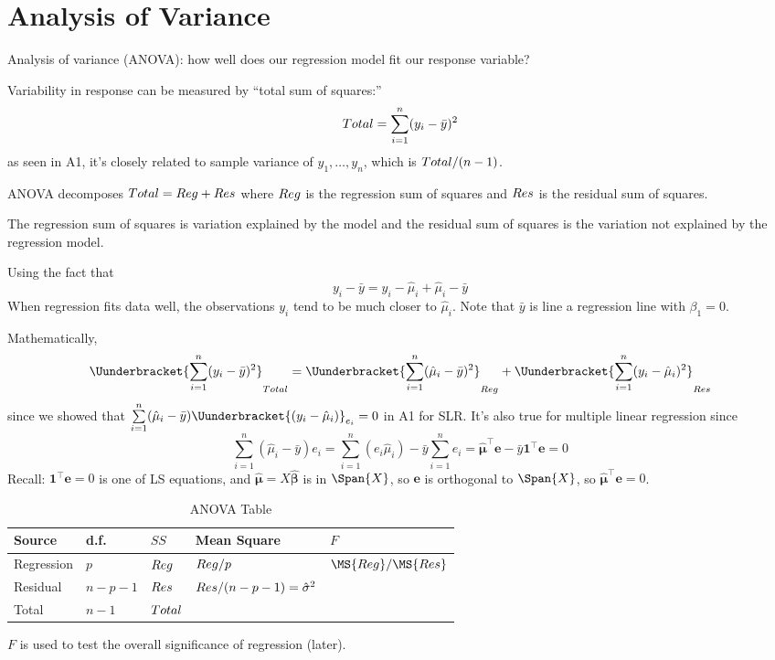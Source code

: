 \section{Analysis of Variance}
Analysis of variance (ANOVA): how well
does our regression model fit our
response variable?

Variability in response can be measured by
``total sum of squares:''
\[ \relax{Total} =
    \sum\limits_{i=1}^{n} (y_i-\bar{y})^2 \]
as seen in A1, it's closely related to
sample variance of $ y_1,\ldots,y_n $,
which is $ \relax{Total}/(n-1) $.

ANOVA decomposes $ \relax{Total}=\relax{Reg}+\relax{Res} $
where $ \relax{Reg} $ is the regression sum of squares
and $ \relax{Res} $ is the residual sum of squares.

The regression sum of squares is variation explained by
the model
and the residual sum of squares is the variation not
explained by the regression model.

Using the fact that
\[ y_i-\bar{y}=y_i-\hat{\mu}_i+\hat{\mu}_i-\bar{y} \]
When regression fits data well,
the observations $ y_i $ tend to be much closer to $ \hat{\mu}_i $.
Note that $ \bar{y} $ is line a regression line with $ \beta_1=0 $.

Mathematically,
\[ \Uunderbracket{\sum\limits_{i=1}^{n} (y_i-\bar{y})^2}_{\SS{Total}}
    =\Uunderbracket{\sum\limits_{i=1}^{n} (\hat{\mu}_i-\bar{y})^2}_{\SS{Reg}}+
    \Uunderbracket{\sum\limits_{i=1}^{n} (y_i-\hat{\mu}_i)^2}_{\SS{Res}} \]
since we showed that $ \sum\limits_{i=1}^{n}(\hat{\mu}_i-\bar{y})
    \Uunderbracket{(y_i-\hat{\mu}_i)}_{e_i}=0 $ in A1 for SLR\@.
It's also true for multiple linear regression since
\[ \sum\limits_{i=1}^{n} (\hat{\mu}_i-\bar{y})e_i=
    \sum\limits_{i=1}^{n} (e_i\hat{\mu}_i)-\bar{y}\sum\limits_{i=1}^{n} e_i
    =\hat{\symbf{\mu}}^\top\symbf{e}-\bar{y}\symbf{1}^\top\symbf{e}=0 \]
Recall: $ \symbf{1}^\top\symbf{e}=0 $ is one of LS equations,
and $ \hat{\symbf{\mu}}=X\hat{\symbf{\beta}} $ is in $ \Span{X} $,
so $ \symbf{e} $ is orthogonal to $ \Span{X} $,
so $ \hat{\symbf{\mu}}^\top\symbf{e}=0 $.

\begin{table}[ht]
    \centering
    \caption{ANOVA Table}
    \begin{tabularx}{\linewidth}{@{}>{\hsize}Y>{\hsize}YYYY@{}}
        \toprule
        Source     & d.f.      & $ SS $         & Mean Square                         & $ F $                 \\
        \midrule
        Regression & $ p $     & $ \relax{Reg} $   & $ \relax{Reg}/p $                      & $ \MS{Reg}/\MS{Res} $ \\
        Residual   & $ n-p-1 $ & $ \relax{Res} $   & $ \relax{Res}/(n-p-1)=\hat{\sigma}^2 $                         \\
        \midrule
        Total      & $ n-1 $   & $ \relax{Total} $                                                               \\
        \bottomrule
    \end{tabularx}
\end{table}
$ F $ is used to test the overall significance of regression (later).

